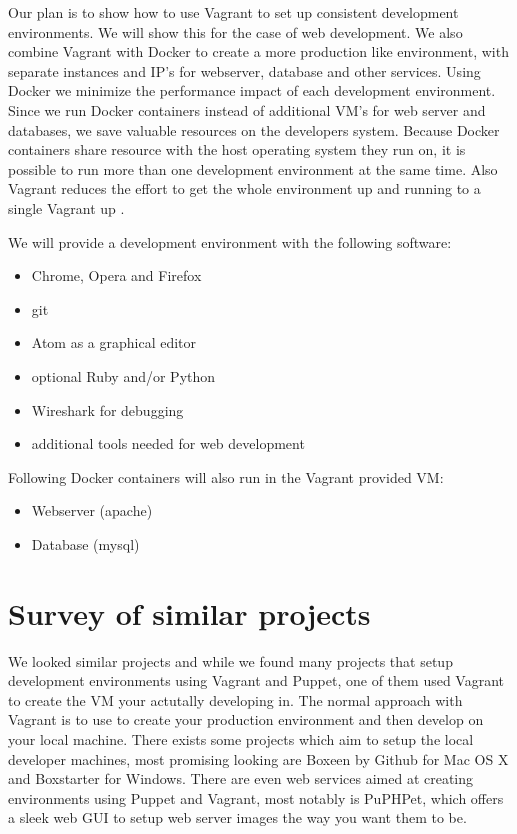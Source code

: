 Our plan is to show how to use Vagrant to set up consistent development environments. We will show this for the case of web development. We also combine Vagrant with Docker to create a more production like environment, with separate instances and IP's for webserver, database and other services. Using Docker we minimize the performance impact of each development environment. Since we run Docker containers instead of additional \gls{VM}'s for web server and databases, we save valuable resources on the developers system. Because Docker containers share resource with the host operating system they run on, it is possible to run more than one development environment at the same time. Also Vagrant reduces the effort to get the whole environment up and running to a single Vagrant up .

We will provide a development environment with the following software:

\begin{itemize}
\item Chrome, Opera and Firefox
\item git
\item Atom as a graphical editor
\item optional Ruby and/or Python
\item Wireshark for debugging
\item additional tools needed for web development
\end{itemize}
Following Docker containers will also run in the Vagrant provided \gls{VM}:
\begin{itemize}
\item Webserver (apache)
\item Database (mysql)
\end{itemize}

\section{Survey of similar projects}

We looked similar projects and while we found many projects that setup development environments using Vagrant and Puppet, one of them used Vagrant to create the \gls{VM} your actutally developing in. The normal approach with Vagrant is to use to create your production environment and then develop on your local machine. There exists some projects which aim to setup the local developer machines, most promising looking are Boxeen by Github for Mac OS X and Boxstarter for Windows. 
There are even web services aimed at creating environments using Puppet and Vagrant, most notably is PuPHPet, which offers a sleek web GUI to setup web server images the way you want them to be.

